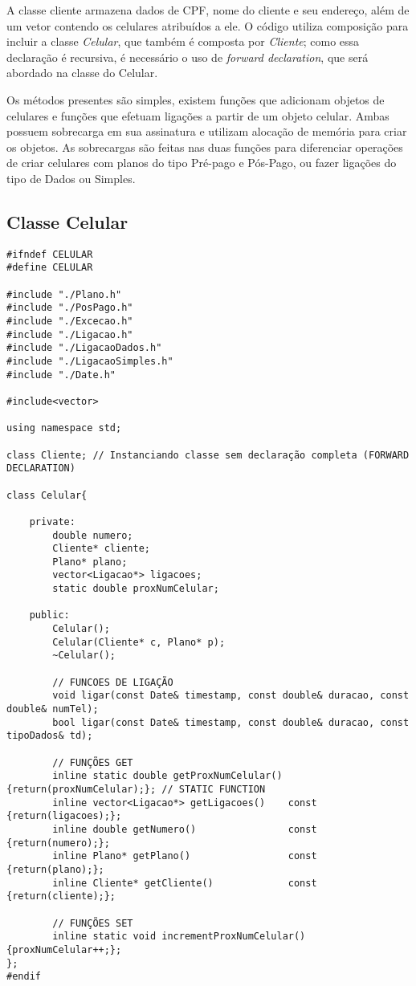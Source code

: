 A classe cliente armazena dados de CPF, nome do cliente e seu endereço, além de um vetor contendo os celulares atribuídos a ele. O código utiliza composição para incluir a classe \textit{Celular}, que também é composta por \textit{Cliente}; como essa declaração é recursiva, é necessário o uso de \textit{forward declaration}, que será abordado na classe do Celular. 

Os métodos presentes são simples, existem funções que adicionam objetos de celulares e funções que efetuam ligações a partir de um objeto celular. Ambas possuem sobrecarga em sua assinatura e utilizam alocação de memória para criar os objetos. As sobrecargas são feitas nas duas funções para diferenciar operações de criar celulares com planos do tipo Pré-pago e Pós-Pago, ou fazer ligações do tipo de Dados ou Simples.


\subsection{Classe Celular} \label{sec:celular}

\begin{lstlisting}[basicstyle=\tiny]
#ifndef CELULAR
#define CELULAR

#include "./Plano.h"
#include "./PosPago.h"
#include "./Excecao.h"
#include "./Ligacao.h"
#include "./LigacaoDados.h"
#include "./LigacaoSimples.h"
#include "./Date.h"

#include<vector>

using namespace std;

class Cliente; // Instanciando classe sem declaração completa (FORWARD DECLARATION)

class Celular{

	private:
		double numero;
		Cliente* cliente;
		Plano* plano;
		vector<Ligacao*> ligacoes;
		static double proxNumCelular;
	
	public:
		Celular();
		Celular(Cliente* c, Plano* p);
		~Celular();
		
		// FUNCOES DE LIGAÇÃO
		void ligar(const Date& timestamp, const double& duracao, const double& numTel);
		bool ligar(const Date& timestamp, const double& duracao, const tipoDados& td);
		
		// FUNÇÕES GET
		inline static double getProxNumCelular()       {return(proxNumCelular);}; // STATIC FUNCTION
		inline vector<Ligacao*> getLigacoes()    const {return(ligacoes);};
		inline double getNumero()                const {return(numero);};
		inline Plano* getPlano()                 const {return(plano);};
		inline Cliente* getCliente()             const {return(cliente);};
		
		// FUNÇÕES SET
		inline static void incrementProxNumCelular() {proxNumCelular++;};
};
#endif
\end{lstlisting}

